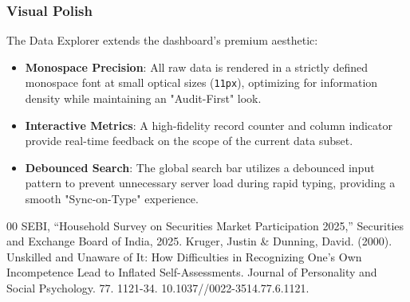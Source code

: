 \documentclass[conference]{IEEEtran}
\begin{document}
\subsubsection{Visual Polish}
The Data Explorer extends the dashboard's premium aesthetic:
\begin{itemize}
    \item \textbf{Monospace Precision}: All raw data is rendered in a strictly defined monospace font at small optical sizes (\texttt{11px}), optimizing for information density while maintaining an "Audit-First" look.
    \item \textbf{Interactive Metrics}: A high-fidelity record counter and column indicator provide real-time feedback on the scope of the current data subset.
    \item \textbf{Debounced Search}: The global search bar utilizes a debounced input pattern to prevent unnecessary server load during rapid typing, providing a smooth "Sync-on-Type" experience.
\end{itemize}

\begin{thebibliography}{00}
 SEBI, ``Household Survey on Securities Market Participation 2025,'' Securities and Exchange Board of India, 2025.
 Kruger, Justin \& Dunning, David. (2000). Unskilled and Unaware of It: How Difficulties in Recognizing One's Own Incompetence Lead to Inflated Self-Assessments. Journal of Personality and Social Psychology. 77. 1121-34. 10.1037//0022-3514.77.6.1121.
\end{thebibliography}
\end{document}
